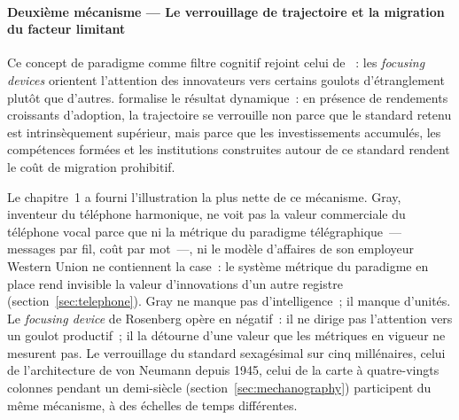 \paragraph{Deuxième mécanisme --- Le verrouillage de trajectoire et la migration du facteur limitant}

\markEVO \markSTS
{} Ce concept de paradigme comme filtre cognitif rejoint celui de \textcite{rosenberg_factors_1969}~: les \emph{focusing devices} orientent l'attention des innovateurs vers certains goulots d'étranglement plutôt que d'autres. \textcite{arthur_competing_1989} formalise le résultat dynamique~: en présence de rendements croissants d'adoption, la trajectoire se verrouille non parce que le standard retenu est intrinsèquement supérieur, mais parce que les investissements accumulés, les compétences formées et les institutions construites autour de ce standard rendent le coût de migration prohibitif.

Le chapitre~1 a fourni l'illustration la plus nette de ce mécanisme. Gray, inventeur du téléphone harmonique, ne voit pas la valeur commerciale du téléphone vocal parce que ni la métrique du paradigme télégraphique~--- messages par fil, coût par mot~---, ni le modèle d'affaires de son employeur Western Union ne contiennent la case~: le système métrique du paradigme en place rend invisible la valeur d'innovations d'un autre registre (section~\ref{sec:telephone}). Gray ne manque pas d'intelligence~; il manque d'unités. Le \emph{focusing device} de Rosenberg opère en négatif~: il ne dirige pas l'attention vers un goulot productif~; il la détourne d'une valeur que les métriques en vigueur ne mesurent pas. Le verrouillage du standard sexagésimal sur cinq millénaires, celui de l'architecture de von Neumann depuis 1945, celui de la carte à quatre-vingts colonnes pendant un demi-siècle (section~\ref{sec:mechanography}) participent du même mécanisme, à des échelles de temps différentes.

